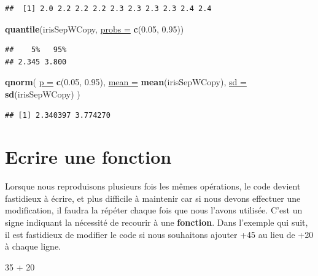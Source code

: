 \documentclass[twoside,symmetric]{book}
\newenvironment{Shaded}{}{}
\newcommand{\DataTypeTok}[1]{\underline{#1}}
\newcommand{\DecValTok}[1]{#1}
\newcommand{\FloatTok}[1]{#1}
\newcommand{\KeywordTok}[1]{\textbf{#1}}
\newcommand{\NormalTok}[1]{#1}
\newcommand{\OperatorTok}[1]{#1}
\newcommand{\StringTok}[1]{#1}
\begin{document}
\begin{verbatim}
##  [1] 2.0 2.2 2.2 2.2 2.3 2.3 2.3 2.3 2.4 2.4
\end{verbatim}

\begin{Shaded}
\begin{Highlighting}[]
\KeywordTok{quantile}\NormalTok{(irisSepWCopy, }\DataTypeTok{probs =} \KeywordTok{c}\NormalTok{(}\FloatTok{0.05}\NormalTok{, }\FloatTok{0.95}\NormalTok{))}
\end{Highlighting}
\end{Shaded}

\begin{verbatim}
##    5%   95% 
## 2.345 3.800
\end{verbatim}

\begin{Shaded}
\begin{Highlighting}[]
\KeywordTok{qnorm}\NormalTok{(}
  \DataTypeTok{p =} \KeywordTok{c}\NormalTok{(}\FloatTok{0.05}\NormalTok{, }\FloatTok{0.95}\NormalTok{), }
  \DataTypeTok{mean =} \KeywordTok{mean}\NormalTok{(irisSepWCopy), }
  \DataTypeTok{sd =} \KeywordTok{sd}\NormalTok{(irisSepWCopy)}
\NormalTok{)}
\end{Highlighting}
\end{Shaded}

\begin{verbatim}
## [1] 2.340397 3.774270
\end{verbatim}

\hypertarget{l015function}{%
\section{Ecrire une fonction}\label{l015function}}

Lorsque nous reproduisons plusieurs fois les mêmes opérations, le code devient fastidieux à écrire, et plus difficile à maintenir car si nous devons effectuer une modification, il faudra la répéter chaque fois que nous l'avons utilisée. C'est un signe indiquant la nécessité de recourir à une \textbf{fonction}. Dans l'exemple qui suit, il est fastidieux de modifier le code si nous souhaitons ajouter +45 au lieu de +20 à chaque ligne.

\begin{Shaded}
\begin{Highlighting}[]
\DecValTok{35} \OperatorTok{+}\StringTok{ }\DecValTok{20}
\end{Highlighting}
\end{Shaded}
\end{document}
